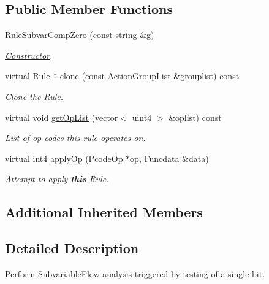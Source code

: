 \subsection*{Public Member Functions}
\begin{DoxyCompactItemize}
\item 
\mbox{\hyperlink{class_rule_subvar_comp_zero_a303be962f9e6e92847aa968ccf2969ae}{Rule\+Subvar\+Comp\+Zero}} (const string \&g)
\begin{DoxyCompactList}\small\item\em \mbox{\hyperlink{class_constructor}{Constructor}}. \end{DoxyCompactList}\item 
virtual \mbox{\hyperlink{class_rule}{Rule}} $\ast$ \mbox{\hyperlink{class_rule_subvar_comp_zero_a4a65d70ce76be64204bd88520d768a79}{clone}} (const \mbox{\hyperlink{class_action_group_list}{Action\+Group\+List}} \&grouplist) const
\begin{DoxyCompactList}\small\item\em Clone the \mbox{\hyperlink{class_rule}{Rule}}. \end{DoxyCompactList}\item 
virtual void \mbox{\hyperlink{class_rule_subvar_comp_zero_aaf2a3915863894c93133588aded9ca8d}{get\+Op\+List}} (vector$<$ uint4 $>$ \&oplist) const
\begin{DoxyCompactList}\small\item\em List of op codes this rule operates on. \end{DoxyCompactList}\item 
virtual int4 \mbox{\hyperlink{class_rule_subvar_comp_zero_a4875048b2b35720b88c6dd2667c4164b}{apply\+Op}} (\mbox{\hyperlink{class_pcode_op}{Pcode\+Op}} $\ast$op, \mbox{\hyperlink{class_funcdata}{Funcdata}} \&data)
\begin{DoxyCompactList}\small\item\em Attempt to apply {\bfseries{this}} \mbox{\hyperlink{class_rule}{Rule}}. \end{DoxyCompactList}\end{DoxyCompactItemize}
\subsection*{Additional Inherited Members}


\subsection{Detailed Description}
Perform \mbox{\hyperlink{class_subvariable_flow}{Subvariable\+Flow}} analysis triggered by testing of a single bit. 

